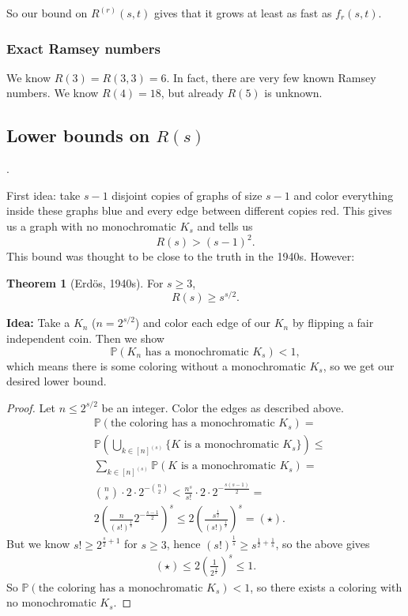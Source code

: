 \documentclass{article}
\theoremstyle{definition}
\newtheorem{theorem}{Theorem}[section]
\begin{document}
So our bound on $R^{(r)}(s,t)$ gives that it grows at least as fast as $f_{r}(s,t)$.

\subsubsection*{Exact Ramsey numbers}

We know $R(3)=R(3,3)=6.$ In fact, there are very few known Ramsey numbers. We know $R(4)=18$, but already $R(5)$ is unknown.

\subsection{Lower bounds on $R(s)$}.

First idea: take $s-1$ disjoint copies of graphs of size $s-1$ and color everything inside these graphs blue and every edge between different copies red. This gives us a graph with no monochromatic $K_s$ and tells us \[
R(s)>(s-1)^2.
\]
This bound was thought to be close to the truth in the 1940s. However:
\begin{theorem}[Erdös, 1940s]
    For $s\ge 3$, \[
    R(s)\ge s^{s/2}.
    \]
\end{theorem}
\textbf{Idea:} Take a $K_n$ ($n=2^{s/2}$) and color each edge of our $K_n$ by flipping a fair independent coin. Then we show \[
\mathbb{P}(K_n \text{ has a monochromatic }K_s)<1,
\]
which means there is some coloring without a monochromatic $K_s$, so we get our desired lower bound.
\begin{proof}
    Let $n\le 2^{s/2}$ be an integer. Color the edges as described above. 
    \begin{align*}
        &\mathbb{P}(\text{the coloring has a monochromatic }K_s) = \\
        &\mathbb{P}(\bigcup_{k \in [n]^{(s)}} \{K \text{ is a monochromatic }K_s\}) \le \\
        & \sum_{k \in [n]^{(s)}}^{} \mathbb{P}(K \text{ is a monochromatic }K_s) =\\
        &{n \choose{s}} \cdot 2\cdot 2^{-{{n}\choose{2}}} < \frac{n^s}{s!}\cdot 2\cdot 2^{-\frac{s(s-1)}{2}} = \\
        & 2\left(\frac{n}{(s!)^{\frac{1}{s}}}2^{-\frac{s-1}{2}}\right)^{s} \le 2 \left( \frac{s^{\frac{1}{2}}}{(s!)^{\frac{1}{s}}}\right)^{s} = (\star).
    \end{align*}
    But we know $s! \ge 2^{\frac{s}{2}+1}$ for $s\ge 3$, hence $(s!)^{\frac{1}{s}}\ge s^{\frac{1}{2}+\frac{1}{s}}$, so the above gives
    \begin{align*}
        (\star) \le 2 \left(\frac{1}{2^{\frac{1}{s}}}\right)^{s} \le 1.
    \end{align*}
    So $\mathbb{P}(\text{the coloring has a monochromatic }K_s)<1$, so there exists a coloring with no monochromatic $K_s$.
\end{proof}
\end{document}
